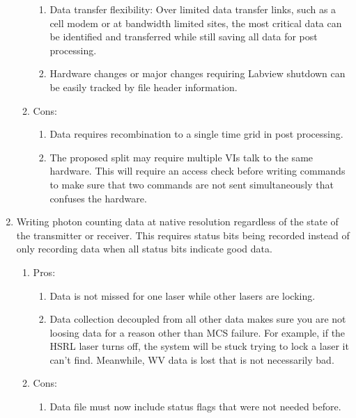 \begin{enumerate}
\begin{enumerate}
{\begin{enumerate}
				\item{Data transfer flexibility: Over limited data transfer links, such as a cell modem or at bandwidth limited sites, the most critical data can be identified and transferred while still saving all data for post processing.}
				\item{Hardware changes or major changes requiring Labview shutdown can be easily tracked by file header information.}
			\end{enumerate}
		}
		\item{Cons:
			\begin{enumerate}
				\item{Data requires recombination to a single time grid in post processing.}
				\item{The proposed split may require multiple VIs talk to the same hardware. This will require an access check before writing commands to make sure that two commands are not sent simultaneously that confuses the hardware.}
			\end{enumerate}
		}
	\end{enumerate}
\item{Writing photon counting data at native resolution regardless of the state of the transmitter or receiver. This requires status bits being recorded instead of only recording data when all status bits indicate good data.}
	\begin{enumerate}
		\item{Pros:
			\begin{enumerate}
				\item{Data is not missed for one laser while other lasers are locking.}
				\item{Data collection decoupled from all other data makes sure you are not loosing data for a reason other than MCS failure. For example, if the HSRL laser turns off, the system will be stuck trying to lock a laser it can't find. Meanwhile, WV data is lost that is not necessarily bad. }
			\end{enumerate}
		}
		\item{Cons:
			\begin{enumerate}
				\item{Data file must now include status flags that were not needed before.}
			\end{enumerate}
		}
	\end{enumerate}
\end{enumerate}


\newpage

